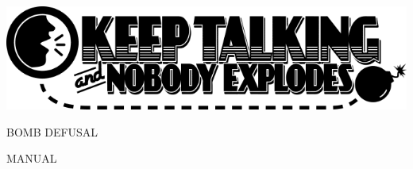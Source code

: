 \documentclass{article}
\begin{document}
{
	\null\vfil
	\huge
	\bf
	\center 
	\includegraphics[scale=0.5]{ktane-logo.png}
	
	BOMB DEFUSAL

	MANUAL
	\null\vfil
}
\end{document}
